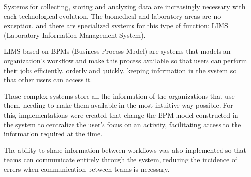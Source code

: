 Systems for collecting, storing and analyzing data are increasingly necessary with each technological evolution. The biomedical and laboratory areas are no exception, and there are specialized systems for this type of function: LIMS (Laboratory Information Management System).

LIMS based on BPMs (Business Process Model) are systems that models an organization's workflow and make this process available so that users can perform their jobs efficiently, orderly and quickly, keeping information in the system so that other users can access it.

These complex systems store all the information of the organizations that use them, needing to make them available in the most intuitive way possible. For this, implementations were created that change the BPM model constructed in the system to centralize the user's focus on an activity, facilitating access to the information required at the time.

The ability to share information between workflows was also implemented so that teams can communicate entirely through the system, reducing the incidence of errors when communication between teams is necessary.